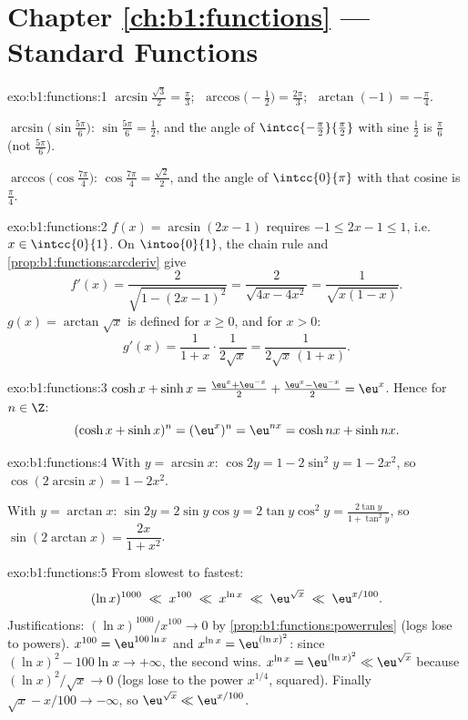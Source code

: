\section*{Chapter \ref{ch:b1:functions} --- Standard Functions}

\begin{solution}{exo:b1:functions:1}
$\arcsin\frac{\sqrt 3}{2} = \frac\pi3$;
$\;\arccos\bigl(-\frac12\bigr) = \frac{2\pi}{3}$;
$\;\arctan(-1) = -\frac\pi4$.

$\arcsin\bigl(\sin\frac{5\pi}{6}\bigr)$: $\sin\frac{5\pi}{6} =
\frac12$, and the angle of $\intcc{-\frac\pi2}{\frac\pi2}$ with sine
$\frac12$ is $\frac\pi6$ (not $\frac{5\pi}{6}$).

$\arccos\bigl(\cos\frac{7\pi}{4}\bigr)$: $\cos\frac{7\pi}{4} =
\frac{\sqrt 2}{2}$, and the angle of $\intcc{0}{\pi}$ with that cosine
is $\frac\pi4$.
\end{solution}

\begin{solution}{exo:b1:functions:2}
$f(x) = \arcsin(2x - 1)$ requires $-1 \leq 2x - 1 \leq 1$, i.e.\ $x
\in \intcc{0}{1}$. On $\intoo{0}{1}$, the chain rule and
\cref{prop:b1:functions:arcderiv} give
\[
f'(x) = \frac{2}{\sqrt{1 - (2x-1)^2}} = \frac{2}{\sqrt{4x - 4x^2}}
= \frac{1}{\sqrt{x(1 - x)}} .
\]
$g(x) = \arctan\sqrt x$ is defined for $x \geq 0$, and for $x > 0$:
\[
g'(x) = \frac{1}{1 + x} \cdot \frac{1}{2\sqrt x}
= \frac{1}{2\sqrt x\,(1 + x)} .
\]
\end{solution}

\begin{solution}{exo:b1:functions:3}
$\cosh x + \sinh x = \frac{\eu^x + \eu^{-x}}{2} + \frac{\eu^x -
\eu^{-x}}{2} = \eu^x$. Hence for $n \in \Z$:
\[
(\cosh x + \sinh x)^n = (\eu^x)^n = \eu^{nx}
= \cosh nx + \sinh nx .
\]
\end{solution}

\begin{solution}{exo:b1:functions:4}
With $y = \arcsin x$: $\cos 2y = 1 - 2\sin^2 y = 1 - 2x^2$, so
$\cos(2\arcsin x) = 1 - 2x^2$.

With $y = \arctan x$: $\sin 2y = 2 \sin y \cos y = 2 \tan y \cos^2 y =
\frac{2\tan y}{1 + \tan^2 y}$, so $\sin(2\arctan x) =
\dfrac{2x}{1 + x^2}$.
\end{solution}

\begin{solution}{exo:b1:functions:5}
From slowest to fastest:
\[
(\ln x)^{1000} \;\ll\; x^{100} \;\ll\; x^{\ln x} \;\ll\;
\eu^{\sqrt x} \;\ll\; \eu^{x/100} .
\]
Justifications: $(\ln x)^{1000}/x^{100} \to 0$ by
\cref{prop:b1:functions:powerrules} (logs lose to powers).
$x^{100} = \eu^{100\ln x}$ and $x^{\ln x} = \eu^{(\ln x)^2}$: since
$(\ln x)^2 - 100\ln x \to +\infty$, the second wins. $x^{\ln x} =
\eu^{(\ln x)^2} \ll \eu^{\sqrt x}$ because $(\ln x)^2/\sqrt x \to 0$
(logs lose to the power $x^{1/4}$, squared). Finally $\sqrt x - x/100
\to -\infty$, so $\eu^{\sqrt x} \ll \eu^{x/100}$.
\end{solution}

